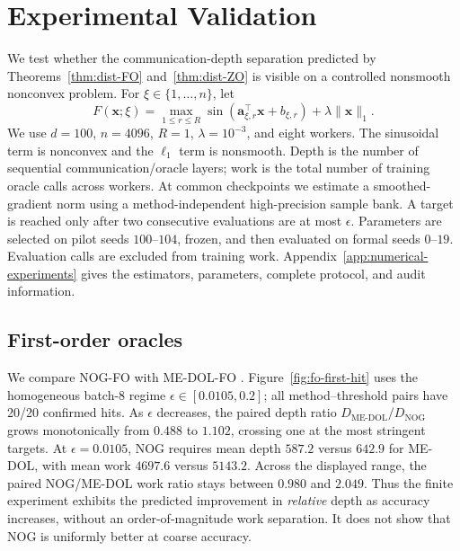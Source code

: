 \documentclass{article}
\def\vx{{\bm{x}}}
\theoremstyle{definition}
\theoremstyle{remark}
\begin{document}
\section{Experimental Validation}\label{sec:experiments}
We test whether the communication-depth separation predicted by
Theorems~\ref{thm:dist-FO} and~\ref{thm:dist-ZO} is visible on a controlled
nonsmooth nonconvex problem.  For $\xi\in\{1,\ldots,n\}$, let
\begin{equation}\label{eq:synthetic-objective}
	F(\vx;\xi)=\max_{1\leq r\leq R}
	\sin(\mathbf{a}_{\xi,r}^{\top}\vx+b_{\xi,r})
	+\lambda\lVert\vx\rVert_1 .
\end{equation}
We use $d=100$, $n=4096$, $R=1$, $\lambda=10^{-3}$, and eight workers.
The sinusoidal term is nonconvex and the $\ell_1$ term is nonsmooth.  Depth is
the number of sequential communication/oracle layers; work is the total number
of training oracle calls across workers.  At common checkpoints we estimate a
smoothed-gradient norm using a method-independent high-precision sample bank.
A target is reached only after two consecutive evaluations are at most
$\epsilon$.  Parameters are selected on pilot seeds $100$--$104$, frozen, and
then evaluated on formal seeds $0$--$19$.  Evaluation calls are excluded from
training work.  Appendix~\ref{app:numerical-experiments} gives the estimators,
parameters, complete protocol, and audit information.

\subsection{First-order oracles}\label{sec:experiments-fo}
We compare NOG-FO with ME-DOL-FO \citep{sahinoglu2024online}.
Figure~\ref{fig:fo-first-hit} uses the homogeneous batch-8 regime
$\epsilon\in[0.0105,0.2]$; all method--threshold pairs have 20/20 confirmed
hits.  As $\epsilon$ decreases, the paired depth ratio
$D_{\mathrm{ME\text{-}DOL}}/D_{\mathrm{NOG}}$ grows monotonically from $0.488$
to $1.102$, crossing one at the most stringent targets.  At $\epsilon=0.0105$,
NOG requires mean depth $587.2$ versus $642.9$ for ME-DOL, with mean work
$4697.6$ versus $5143.2$.  Across the displayed range, the paired NOG/ME-DOL
work ratio stays between $0.980$ and $2.049$.  Thus the finite experiment
exhibits the predicted improvement in \emph{relative} depth as accuracy
increases, without an order-of-magnitude work separation.  It does not show
that NOG is uniformly better at coarse accuracy.
\end{document}
